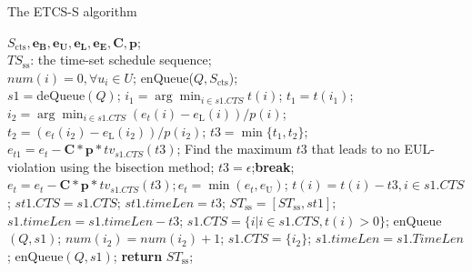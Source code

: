 \documentclass[journal,10pt]{IEEEtran}
\begin{document}
\begin{algorithm}[!htb]
\caption{The ETCS-S algorithm}
\begin{algorithmic}[1]\label{Alg_ETCS_S}
    \REQUIRE $S_\text{cts},\mathbf{e_B}, \mathbf{e_U}, \mathbf{e_L}, \mathbf{e_E}, \mathbf{C}, \mathbf{p}$;\\
    \ENSURE $TS_\text{ss}$: the time-set schedule sequence;\\
    \STATE $num(i)=0, {\forall}u_i{\in}U$; enQueue($Q,S_\text{cts}$); \\
        \STATE $s1{=}$deQueue$(Q)$;
        \STATE $i_1{=}\arg \min_{i{\in}s1.CTS}t(i)$; $t_1{=}t(i_1)$; \label{line_timelen_time}
        \STATE $i_2{=}\arg \min_{i{\in}s1.CTS}(e_t(i){-}e_\text{L}(i))/p(i)$; $t_2{=}(e_t(i_2){-}e_\text{L}(i_2))/p(i_2)$; \label{line_timelen_emin}
            \STATE $t3{=}\min\{t_1,t_2\}$;
            \STATE $e_{t1}{=}e_t{-}\mathbf{C}{*}\mathbf{p}{*}tv_{s1.CTS}(t3)$;
                \STATE Find the maximum $t3$ that leads to no EUL-violation using the bisection method;\label{line_timelen_emax}
                    \STATE $t3{=}\epsilon$;\textbf{break};\label{slicelen2epsilon}
                \ENDIF
            \ENDWHILE
            \STATE $e_{t}{=}e_t{-}\mathbf{C}{*}\mathbf{p}{*}tv_{s1.CTS}(t3); e_{t}{=}\min{(e_{t},e_\text{U})}$;
            \STATE $t(i){=}t(i){-}t3, i{\in}s1.CTS$;
            \STATE $st1.CTS{=}s1.CTS$; $st1.timeLen{=}t3$;
            \STATE $ST_\text{ss}{=}[ST_\text{ss},st1]$;$s1.timeLen{=}s1.timeLen{-}t3$;
            \STATE $s1.CTS{=}\{i|i{\in}s1.CTS, t(i){>}0\}$;
                \STATE enQueue$(Q,s1)$;
            \ENDIF
        \ELSE
            \STATE $num(i_2){=}num(i_2){+}1$;
                \STATE $s1.CTS{=}\{i_2\}$; $s1.timeLen{=}s1.TimeLen$;
                \STATE enQueue$(Q,s1)$;
            \ENDIF
        \ENDIF
     \ENDWHILE
     \STATE \textbf{return} $ST_\text{ss}$;
\end{algorithmic}
\end{algorithm}
\end{document}
